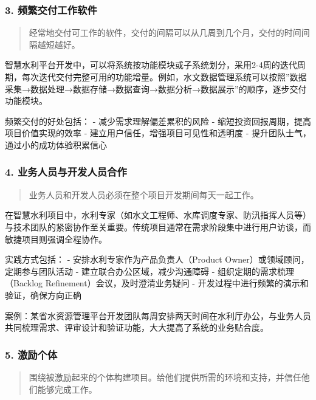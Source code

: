 \subsubsection{3.
频繁交付工作软件}\label{ux9891ux7e41ux4ea4ux4ed8ux5de5ux4f5cux8f6fux4ef6}

\begin{quote}
经常地交付可工作的软件，交付的间隔可以从几周到几个月，交付的时间间隔越短越好。
\end{quote}

智慧水利平台开发中，可以将系统按功能模块或子系统划分，采用2-4周的迭代周期，每次迭代交付完整可用的功能增量。例如，水文数据管理系统可以按照''数据采集→数据处理→数据存储→数据查询→数据分析→数据展示''的顺序，逐步交付功能模块。

频繁交付的好处包括： - 减少需求理解偏差累积的风险 -
缩短投资回报周期，提高项目价值实现的效率 -
建立用户信任，增强项目可见性和透明度 -
提升团队士气，通过小的成功体验积累信心

\subsubsection{4.
业务人员与开发人员合作}\label{ux4e1aux52a1ux4ebaux5458ux4e0eux5f00ux53d1ux4ebaux5458ux5408ux4f5c}

\begin{quote}
业务人员和开发人员必须在整个项目开发期间每天一起工作。
\end{quote}

在智慧水利项目中，水利专家（如水文工程师、水库调度专家、防汛指挥人员等）与技术团队的紧密协作至关重要。传统项目通常在需求阶段集中进行用户访谈，而敏捷项目则强调全程协作。

实践方式包括： - 安排水利专家作为产品负责人（Product
Owner）或领域顾问，定期参与团队活动 - 建立联合办公区域，减少沟通障碍 -
组织定期的需求梳理（Backlog Refinement）会议，及时澄清业务疑问 -
开发过程中进行频繁的演示和验证，确保方向正确

案例：某省水资源管理平台开发团队每周安排两天时间在水利厅办公，与业务人员共同梳理需求、评审设计和验证功能，大大提高了系统的业务贴合度。

\subsubsection{5. 激励个体}\label{ux6fc0ux52b1ux4e2aux4f53}

\begin{quote}
围绕被激励起来的个体构建项目。给他们提供所需的环境和支持，并信任他们能够完成工作。
\end{quote}

